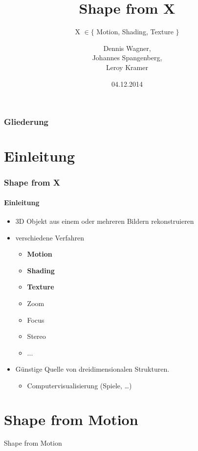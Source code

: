 \documentclass{beamer}
\title{Shape from X}
\subtitle{X $\in \{$ Motion, Shading, Texture $\}$}
\author{Dennis Wagner, \\ Johannes Spangenberg, \\ Leroy Kramer}
\date{04.12.2014}
\begin{document}
\begin{acronym}[SIFT]
\end{acronym}


\frame{\titlepage} 


\begin{frame}
	\frametitle{Gliederung}
	\tableofcontents
\end{frame} 


\section{Einleitung} 
\begin{frame}
	\frametitle{Shape from X}
	\framesubtitle{Einleitung}
	
	\begin{itemize}
		\item 3D Objekt aus einem oder mehreren Bildern rekonstruieren
		\item verschiedene Verfahren
		\begin{itemize}
			\item \textbf{Motion}
			\item \textbf{Shading}
			\item \textbf{Texture}
			\item Zoom
			\item Focus
			\item Stereo
			\item ...
		\end{itemize}
		\item Günstige Quelle von dreidimensionalen Strukturen.
		\begin{itemize}
			\item Computervisualisierung (Spiele, \dots)
		\end{itemize}
		
	\end{itemize}
\end{frame}


\section{Shape from Motion}

\begin{frame}	
	\center	\huge Shape from Motion
\end{frame}
\end{document}
